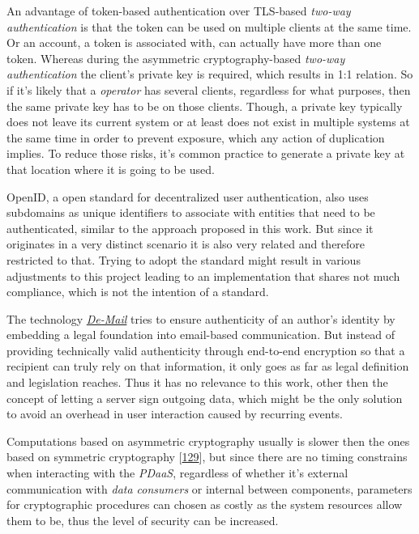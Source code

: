 \documentclass[12pt,english,a4paper,titlepage,cleardoublepage=empty,dottedtoc]{report}
\begin{document}
An advantage of token-based authentication over TLS-based \emph{two-way
authentication} is that the token can be used on multiple clients at the
same time. Or an account, a token is associated with, can actually have
more than one token. Whereas during the asymmetric cryptography-based
\emph{two-way authentication} the client's private key is required,
which results in 1:1 relation. So if it's likely that a \emph{operator}
has several clients, regardless for what purposes, then the same private
key has to be on those clients. Though, a private key typically does not
leave its current system or at least does not exist in multiple systems
at the same time in order to prevent exposure, which any action of
duplication implies. To reduce those risks, it's common practice to
generate a private key at that location where it is going to be used.

OpenID, a open standard for decentralized user authentication, also uses
subdomains as unique identifiers to associate with entities that need to
be authenticated, similar to the approach proposed in this work. But
since it originates in a very distinct scenario it is also very related
and therefore restricted to that. Trying to adopt the standard might
result in various adjustments to this project leading to an
implementation that shares not much compliance, which is not the
intention of a standard.

The technology \emph{\protect\hyperlink{def--de-mail}{De-Mail}} tries to
ensure authenticity of an author's identity by embedding a legal
foundation into email-based communication. But instead of providing
technically valid authenticity through end-to-end encryption so that a
recipient can truly rely on that information, it only goes as far as
legal definition and legislation reaches. Thus it has no relevance to
this work, other then the concept of letting a server sign outgoing
data, which might be the only solution to avoid an overhead in user
interaction caused by recurring events.

Computations based on asymmetric cryptography usually is slower then the
ones based on symmetric cryptography
{[}\protect\hyperlink{ref-book_2014_chapter-10-5-asym-random-number-gen}{129}{]},
but since there are no timing constrains when interacting with the
\emph{PDaaS}, regardless of whether it's external communication with
\emph{data consumers} or internal between components, parameters for
cryptographic procedures can chosen as costly as the system resources
allow them to be, thus the level of security can be increased.
\end{document}
